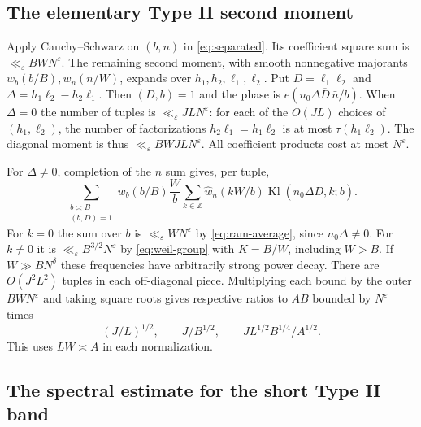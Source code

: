 \documentclass[11pt]{amsart}
\numberwithin{equation}{section}
\theoremstyle{remark}
\begin{document}
\subsection{The elementary Type II second moment}
\label{sec:second}
Apply Cauchy--Schwarz on \((b,n)\) in \eqref{eq:separated}. Its
coefficient square sum is \(\ll_\varepsilon BW N^\varepsilon\).
The remaining second moment, with smooth nonnegative majorants
\(w_b(b/B),w_n(n/W)\), expands over \(h_1,h_2,\ell_1,\ell_2\).
Put \(D=\ell_1\ell_2\) and \(\Delta=h_1\ell_2-h_2\ell_1\).
Then \((D,b)=1\) and the phase is \(e(n_0\Delta\overline D\,\bar n/b)\).
When \(\Delta=0\) the number of tuples is \(\ll_\varepsilon JL N^\varepsilon\):
for each of the \(O(JL)\) choices of \((h_1,\ell_2)\), the number of
factorizations \(h_2\ell_1=h_1\ell_2\) is at most \(\tau(h_1\ell_2)\).
The diagonal moment is thus \(\ll_\varepsilon BWJL N^\varepsilon\).
All coefficient products cost at most \(N^\varepsilon\).

For \(\Delta\ne0\), completion of the \(n\) sum gives, per tuple,
\begin{equation}\label{eq:second-poisson}
 \sum_{\substack{b\asymp B\\(b,D)=1}}
 w_b(b/B)\frac{W}{b}
 \sum_{k\in\mathbb Z}\widehat w_n(kW/b)
 \operatorname{Kl}(n_0\Delta\overline D,k;b).
\end{equation}
For \(k=0\) the sum over \(b\) is \(\ll_\varepsilon WN^\varepsilon\)
by \eqref{eq:ram-average}, since \(n_0\Delta\ne0\).
For \(k\ne0\) it is \(\ll_\varepsilon B^{3/2}N^\varepsilon\)
by \eqref{eq:weil-group} with \(K=B/W\), including \(W>B\).
If \(W\gg BN^\delta\) these frequencies have arbitrarily strong power decay.
There are \(O(J^2L^2)\) tuples in each off-diagonal piece. Multiplying
each bound by the outer \(BW N^\varepsilon\) and taking square roots
gives respective ratios to \(AB\) bounded by \(N^\varepsilon\) times
\[
 (J/L)^{1/2},\qquad J/B^{1/2},\qquad
 J L^{1/2}B^{1/4}/A^{1/2}.
\]
This uses \(LW\asymp A\) in each normalization.

\subsection{The spectral estimate for the short Type II band}
\label{sec:spectral-completion}
\end{document}
